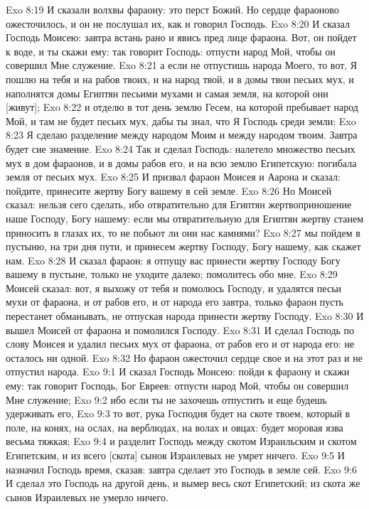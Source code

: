 Exo 8:19  И сказали волхвы фараону: это перст Божий. Но сердце фараоново ожесточилось, и он не послушал их, как и говорил Господь.
Exo 8:20  И сказал Господь Моисею: завтра встань рано и явись пред лице фараона. Вот, он пойдет к воде, и ты скажи ему: так говорит Господь: отпусти народ Мой, чтобы он совершил Мне служение.
Exo 8:21  а если не отпустишь народа Моего, то вот, Я пошлю на тебя и на рабов твоих, и на народ твой, и в домы твои песьих мух, и наполнятся домы Египтян песьими мухами и самая земля, на которой они [живут];
Exo 8:22  и отделю в тот день землю Гесем, на которой пребывает народ Мой, и там не будет песьих мух, дабы ты знал, что Я Господь среди земли;
Exo 8:23  Я сделаю разделение между народом Моим и между народом твоим. Завтра будет сие знамение.
Exo 8:24  Так и сделал Господь: налетело множество песьих мух в дом фараонов, и в домы рабов его, и на всю землю Египетскую: погибала земля от песьих мух.
Exo 8:25  И призвал фараон Моисея и Аарона и сказал: пойдите, принесите жертву Богу вашему в сей земле.
Exo 8:26  Но Моисей сказал: нельзя сего сделать, ибо отвратительно для Египтян жертвоприношение наше Господу, Богу нашему: если мы отвратительную для Египтян жертву станем приносить в глазах их, то не побьют ли они нас камнями?
Exo 8:27  мы пойдем в пустыню, на три дня пути, и принесем жертву Господу, Богу нашему, как скажет нам.
Exo 8:28  И сказал фараон: я отпущу вас принести жертву Господу Богу вашему в пустыне, только не уходите далеко; помолитесь обо мне.
Exo 8:29  Моисей сказал: вот, я выхожу от тебя и помолюсь Господу, и удалятся песьи мухи от фараона, и от рабов его, и от народа его завтра, только фараон пусть перестанет обманывать, не отпуская народа принести жертву Господу.
Exo 8:30  И вышел Моисей от фараона и помолился Господу.
Exo 8:31  И сделал Господь по слову Моисея и удалил песьих мух от фараона, от рабов его и от народа его: не осталось ни одной.
Exo 8:32  Но фараон ожесточил сердце свое и на этот раз и не отпустил народа.
Exo 9:1  И сказал Господь Моисею: пойди к фараону и скажи ему: так говорит Господь, Бог Евреев: отпусти народ Мой, чтобы он совершил Мне служение;
Exo 9:2  ибо если ты не захочешь отпустить и еще будешь удерживать его,
Exo 9:3  то вот, рука Господня будет на скоте твоем, который в поле, на конях, на ослах, на верблюдах, на волах и овцах: будет моровая язва весьма тяжкая;
Exo 9:4  и разделит Господь между скотом Израильским и скотом Египетским, и из всего [скота] сынов Израилевых не умрет ничего.
Exo 9:5  И назначил Господь время, сказав: завтра сделает это Господь в земле сей.
Exo 9:6  И сделал это Господь на другой день, и вымер весь скот Египетский; из скота же сынов Израилевых не умерло ничего.
